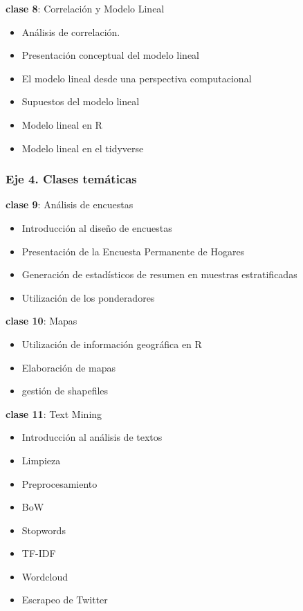\documentclass[]{book}
\providecommand{\tightlist}{%
  \setlength{\itemsep}{0pt}\setlength{\parskip}{0pt}}
\begin{document}
\textbf{clase 8}: Correlación y Modelo Lineal

\begin{itemize}
\tightlist
\item
  Análisis de correlación.
\item
  Presentación conceptual del modelo lineal
\item
  El modelo lineal desde una perspectiva computacional
\item
  Supuestos del modelo lineal
\item
  Modelo lineal en R
\item
  Modelo lineal en el tidyverse
\end{itemize}

\hypertarget{eje-4.-clases-tematicas}{%
\subsubsection*{\texorpdfstring{\textbf{Eje 4. Clases temáticas}}{Eje 4. Clases temáticas}}\label{eje-4.-clases-tematicas}}

\textbf{clase 9}: Análisis de encuestas

\begin{itemize}
\tightlist
\item
  Introducción al diseño de encuestas
\item
  Presentación de la Encuesta Permanente de Hogares
\item
  Generación de estadísticos de resumen en muestras estratificadas
\item
  Utilización de los ponderadores
\end{itemize}

\textbf{clase 10}: Mapas

\begin{itemize}
\tightlist
\item
  Utilización de información geográfica en R
\item
  Elaboración de mapas
\item
  gestión de shapefiles
\end{itemize}

\textbf{clase 11}: Text Mining

\begin{itemize}
\tightlist
\item
  Introducción al análisis de textos
\item
  Limpieza
\item
  Preprocesamiento
\item
  BoW
\item
  Stopwords
\item
  TF-IDF
\item
  Wordcloud
\item
  Escrapeo de Twitter
\end{itemize}
\end{document}

